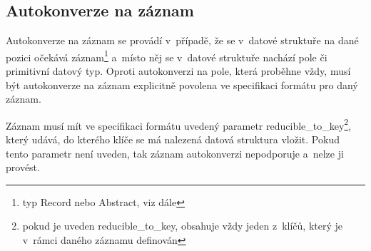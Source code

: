 \documentclass[FM,bw,DP]{tulthesis}
\begin{document}
\subsection{Autokonverze na záznam}

Autokonverze na záznam se provádí v~případě, že se v~datové struktuře na dané pozici očekává záznam\footnote{typ Record nebo Abstract, viz dále} a~místo něj se v~datové struktuře nachází pole či primitivní datový typ. Oproti autokonverzi na pole, která proběhne vždy, musí být autokonverze na záznam explicitně povolena ve specifikaci formátu pro daný záznam.

Záznam musí mít ve specifikaci formátu uvedený parametr reducible\_to\_key\footnote{pokud je uveden reducible\_to\_key, obsahuje vždy jeden z~klíčů, který je v~rámci daného záznamu definován}, který udává, do kterého klíče se má nalezená datová struktura vložit. Pokud tento parametr není uveden, tak záznam autokonverzi nepodporuje a~nelze ji provést.
\end{document}
